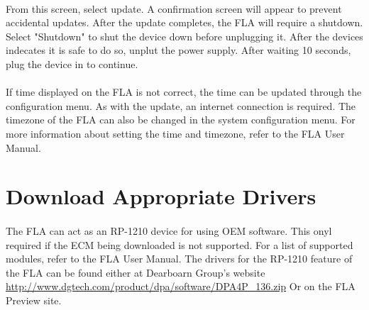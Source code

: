 \documentclass[11pt, oneside]{book}
\begin{document}
\\[\baselineskip]
From this screen, select update. A confirmation screen will appear to prevent accidental updates.\newline
After the update completes, the FLA will require a shutdown. Select "Shutdown" to shut the device down before unplugging it. After the devices indecates it is safe to do so, unplut the power supply. After waiting 10 seconds, plug the device in to continue.
\paragraph{  }
If time displayed on the FLA is not correct, the time can be updated through the configuration menu. As with the update, an internet connection is required. The timezone of the FLA can also be changed in the system configuration menu. For more information about setting the time and timezone, refer to the FLA User Manual.
\section{Download Appropriate Drivers}
\paragraph{  }
The FLA can act as an RP-1210 device for using OEM software. This onyl required if the ECM being downloaded is not supported. For a list of supported modules, refer to the FLA User Manual. The drivers for the RP-1210 feature of the FLA can be found either at Dearboarn Group's website
\url{http://www.dgtech.com/product/dpa/software/DPA4P_136.zip} 
Or on the FLA Preview site.
\end{document}

